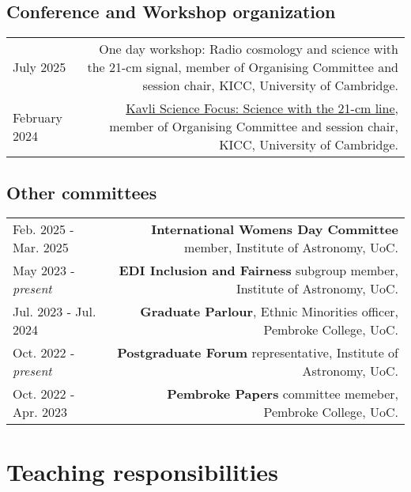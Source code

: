 \documentclass{article}
\begin{document}
\subsection*{Conference and Workshop organization}

\begin{longtable}{L!{\vrule}R}

  July 2025  & One day workshop: Radio cosmology and science with the 21-cm signal, member of Organising Committee and session chair, KICC, University of Cambridge. \\

  February 2024 & \href{https://www.kicc.cam.ac.uk/events/kavli-science-themed-meetings/science-21-cm-hydrogen-line}{Kavli Science Focus: Science with the 21-cm line}, member of Organising Committee and session chair, KICC, University of Cambridge. \\
\end{longtable}

\subsection*{Other committees}

\begin{longtable}{L!{\vrule}R}

  Feb. 2025 - Mar. 2025 & \textbf{International Womens Day Committee} member, Institute of Astronomy, UoC. \\

  May 2023 - \textit{present} & \textbf{EDI Inclusion and Fairness} subgroup member, Institute of Astronomy, UoC. \\

  Jul. 2023 - Jul. 2024 & \textbf{Graduate Parlour}, Ethnic Minorities officer, Pembroke College, UoC. \\

  Oct. 2022 - \textit{present} & \textbf{Postgraduate Forum} representative, Institute of Astronomy, UoC. \\

  Oct. 2022 - Apr. 2023 & \textbf{Pembroke Papers} committee memeber, Pembroke College, UoC. \\
\end{longtable}

\section*{Teaching responsibilities}
\end{document}
